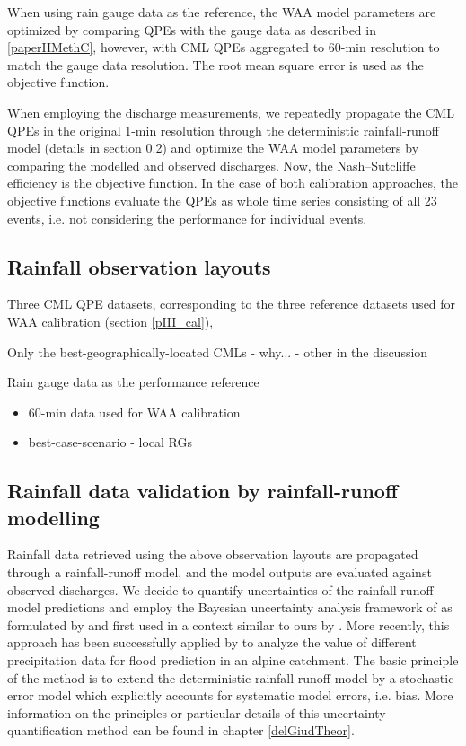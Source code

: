 \documentclass{ctuthesis}\usepackage[]{graphicx}\usepackage[]{color}
\begin{document}
When using rain gauge data as the reference, the WAA model parameters are optimized by comparing QPEs with the gauge data as described in \ref{paperIIMethC}, however, with CML QPEs aggregated to 60-min resolution to match the gauge data resolution. The root mean square error is used as the objective function. 

When employing the discharge measurements, we repeatedly propagate the CML QPEs in the original 1-min resolution through the deterministic rainfall-runoff model (details in section \ref{pIII_val}) and optimize the WAA model parameters by comparing the modelled and observed discharges. Now, the Nash–Sutcliffe efficiency is the objective function. In the case of both calibration approaches, the objective functions evaluate the QPEs as whole time series consisting of all 23 events, i.e. not considering the performance for individual events.


\subsection{Rainfall observation layouts} \label{pIII_rainfall_scen}

Three CML QPE datasets, corresponding to the three reference datasets used for WAA calibration (section \ref{pIII_cal}),

Only the best-geographically-located CMLs -  why... - other in the discussion

Rain gauge data as the performance reference
\begin{itemize}
\item 60-min data used for WAA calibration
\item best-case-scenario - local RGs
\end{itemize}


\subsection{Rainfall data validation by rainfall-runoff modelling} \label{pIII_val}

Rainfall data retrieved using the above observation layouts are propagated through a rainfall-runoff model, and the model outputs are evaluated against observed discharges. We decide to quantify uncertainties of the rainfall-runoff model predictions and employ the Bayesian uncertainty analysis framework of  \cite{kennedy2001bayesian} as formulated by \cite{reichert2012linking} and first used in a context similar to ours by \cite{giudice2013improving}. More recently, this approach has been successfully applied by \cite{sikorskaValueDifferentPrecipitation2018} to analyze the value of different precipitation data for flood prediction in an alpine catchment. The basic principle of the method is to extend the deterministic rainfall-runoff model by a stochastic error model which explicitly accounts for systematic model errors, i.e. bias. More information on the principles or particular details of this uncertainty quantification method can be found in chapter \ref{delGiudTheor}.
\end{document}

